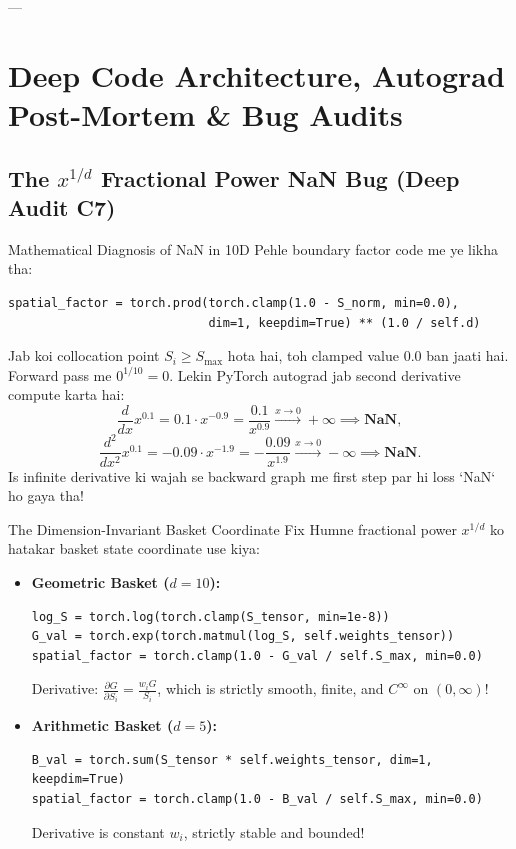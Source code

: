 \documentclass[11pt,a4paper,oneside]{book}
\begin{document}
---

\chapter{Deep Code Architecture, Autograd Post-Mortem \& Bug Audits}

\section{The $x^{1/d}$ Fractional Power NaN Bug (Deep Audit C7)}
\begin{auditbox}{Mathematical Diagnosis of NaN in 10D}
Pehle boundary factor code me ye likha tha:
\begin{verbatim}
spatial_factor = torch.prod(torch.clamp(1.0 - S_norm, min=0.0), 
                            dim=1, keepdim=True) ** (1.0 / self.d)
\end{verbatim}
Jab koi collocation point $S_i \ge S_{\max}$ hota hai, toh clamped value $0.0$ ban jaati hai. 
Forward pass me $0^{1/10} = 0$. Lekin PyTorch autograd jab second derivative compute karta hai:
\begin{equation}
    \frac{d}{dx} x^{0.1} = 0.1 \cdot x^{-0.9} = \frac{0.1}{x^{0.9}} \xrightarrow{x \to 0} +\infty \implies \mathbf{NaN},
\end{equation}
\begin{equation}
    \frac{d^2}{dx^2} x^{0.1} = -0.09 \cdot x^{-1.9} = -\frac{0.09}{x^{1.9}} \xrightarrow{x \to 0} -\infty \implies \mathbf{NaN}.
\end{equation}
Is infinite derivative ki wajah se backward graph me first step par hi loss `NaN` ho gaya tha!
\end{auditbox}

\begin{codebox}{The Dimension-Invariant Basket Coordinate Fix}
Humne fractional power $x^{1/d}$ ko hatakar basket state coordinate use kiya:
\begin{itemize}
    \item \textbf{Geometric Basket ($d=10$):}
    \begin{verbatim}
log_S = torch.log(torch.clamp(S_tensor, min=1e-8))
G_val = torch.exp(torch.matmul(log_S, self.weights_tensor))
spatial_factor = torch.clamp(1.0 - G_val / self.S_max, min=0.0)
    \end{verbatim}
    Derivative: $\frac{\partial G}{\partial S_i} = \frac{w_i G}{S_i}$, which is strictly smooth, finite, and $C^\infty$ on $(0, \infty)$!
    \item \textbf{Arithmetic Basket ($d=5$):}
    \begin{verbatim}
B_val = torch.sum(S_tensor * self.weights_tensor, dim=1, keepdim=True)
spatial_factor = torch.clamp(1.0 - B_val / self.S_max, min=0.0)
    \end{verbatim}
    Derivative is constant $w_i$, strictly stable and bounded!
\end{itemize}
\end{codebox}
\end{document}

